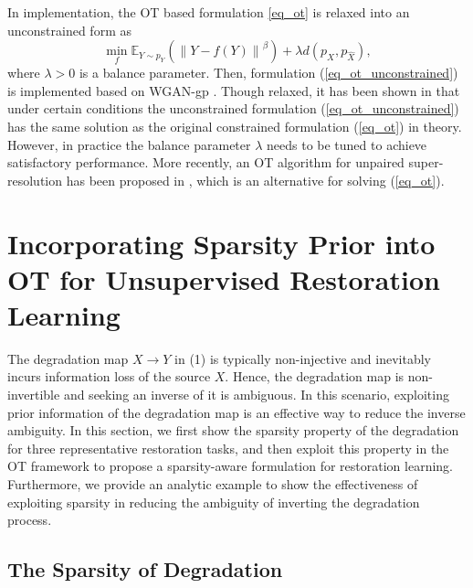 \documentclass[10pt,journal,compsoc]{IEEEtran}
\begin{document}
In implementation, the OT based formulation \eqref{eq_ot} 
is relaxed into an unconstrained form as
\begin{equation}
\mathop {\min }\limits_f {{\mathbb E}_{Y \sim {p_Y}}}\left(\left\|Y-f(Y)\right\|^\beta\right) + \lambda d({p_X},{p_{\hat X}}),
\label{eq_ot_unconstrained}
\end{equation}
where $\lambda > 0$ is a balance parameter. 
Then, formulation (\ref{eq_ot_unconstrained})
is implemented based on WGAN-gp \cite{wgangp}.
Though relaxed, it has been shown in 
\cite{wang2022optimal} that under certain 
conditions the unconstrained formulation 
(\ref{eq_ot_unconstrained}) has the same 
solution as the original constrained 
formulation (\ref{eq_ot}) in theory.
However, in practice the balance parameter $\lambda$
needs to be tuned to achieve satisfactory performance.
More recently, an OT algorithm for
unpaired super-resolution has been
proposed in \cite{ot-sr2022}, which is 
an alternative for solving (\ref{eq_ot}).



\section{Incorporating Sparsity Prior into 
OT for Unsupervised Restoration Learning}

The degradation map $X\rightarrow Y$ in (1) is typically non-injective and
inevitably incurs information loss of the source $X$.
Hence, the degradation map is non-invertible and seeking
an inverse of it is ambiguous. In this scenario, exploiting
prior information of the degradation map is an effective way
to reduce the inverse ambiguity. In this section, we first
show the sparsity property of the degradation for three
representative restoration tasks, and then exploit this property
in the OT framework to propose a sparsity-aware
formulation for restoration learning. Furthermore, we provide an analytic
example to show the effectiveness of exploiting sparsity in
reducing the ambiguity of inverting the degradation process.

\subsection{The Sparsity of Degradation}
\end{document}
